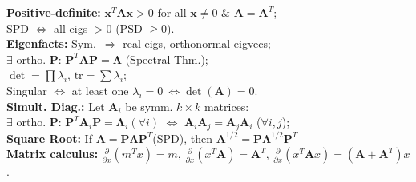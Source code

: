 \documentclass[10pt,landscape]{article}
\begin{document}
\begin{multicols}{3}
\smallskip
\textbf{Positive-definite:} $\mathbf{x}^T \mathbf{A} \mathbf{x} > 0$ for all $\mathbf{x}\neq 0$ \& $\mathbf{A} = \mathbf{A}^T$;\\
\hspace*{1em} SPD $\Leftrightarrow$ all eigs $>0$ (PSD $\ge0$).\\
\smallskip
\textbf{Eigenfacts:} Sym.\ $\Rightarrow$ real eigs, orthonormal eigvecs; \\
\hspace*{1em} $\exists$ ortho. $\mathbf{P}$: $\mathbf{P}^T \mathbf{A} \mathbf{P} = \mathbf{\Lambda}$ (Spectral Thm.);\\
\hspace*{1em} $\det = \prod \lambda_i$, $\mathrm{tr} = \sum\lambda_i$;\\
\hspace*{1em} Singular $\Leftrightarrow$ at least one $\lambda_i = 0 \ \Leftrightarrow \det(\mathbf{A}) = 0$.\\
\smallskip
\textbf{Simult. Diag.:} Let $\mathbf{A}_i$ be symm. $k \times k$ matrices:\\
\hspace*{1em} $\exists$ ortho. $\mathbf{P}$: $\mathbf{P}^T \mathbf{A}_i \mathbf{P} = \mathbf{\Lambda}_i (\forall i)$ $\Leftrightarrow$ $\mathbf{A}_i \mathbf{A}_j=\mathbf{A}_j\mathbf{A}_i$ ($\forall i,j$);\\
\smallskip
\textbf{Square Root:} If $\mathbf A= \mathbf P\boldsymbol\Lambda\mathbf P^T$(SPD), then $\mathbf A^{1/2}= \mathbf P\boldsymbol\Lambda^{1/2}\mathbf P^T$\\
\smallskip
\textbf{Matrix calculus:} $\frac{\partial}{\partial x}(m^T x) = m$, 
$\frac{\partial}{\partial x}(x^T \mathbf{A}) = \mathbf{A}^T$, 
$\frac{\partial}{\partial x}(x^T \mathbf{A} x) = (\mathbf{A}+\mathbf{A}^T)x$.\\
\medskip

\end{multicols}
\end{document}
